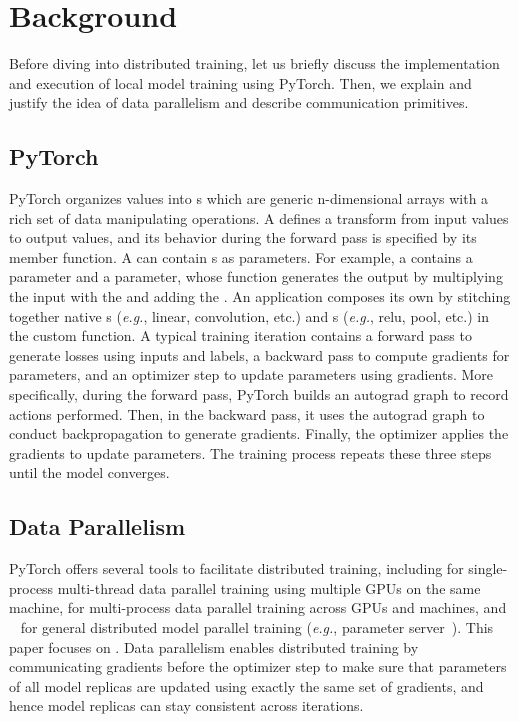 \newpage
\section{Background} \label{sec:background}

Before diving into distributed training, let us briefly discuss the implementation and execution of local model training using PyTorch. Then, we explain and justify the idea of data parallelism and describe communication primitives.

\subsection{PyTorch}

PyTorch organizes values into s which are generic n-dimensional arrays with a rich set of data manipulating operations. A  defines a transform from input values to output values, and its behavior during the forward pass is specified by its  member function. A  can contain s as parameters. For example, a   contains a  parameter and a  parameter, whose  function generates the output by multiplying the input with the  and adding the . An application composes its own  by stitching together native s (\emph{e.g.}, linear, convolution, etc.) and s (\emph{e.g.}, relu, pool, etc.) in the custom  function. A typical training iteration contains a forward pass to generate losses using inputs and labels, a backward pass to compute gradients for parameters, and an optimizer step to update parameters using gradients. More specifically, during the forward pass, PyTorch builds an autograd graph to record actions performed. Then, in the backward pass, it uses the autograd graph to conduct backpropagation to generate gradients. Finally, the optimizer applies the gradients to update parameters. The training process repeats these three steps until the model converges. 


\subsection{Data Parallelism}

PyTorch offers several tools to facilitate distributed training, including  for single-process multi-thread data parallel training using multiple GPUs on the same machine,  for multi-process data parallel training across GPUs and machines, and ~\cite{rpc} for general distributed model parallel training (\emph{e.g.}, parameter server~\cite{ps}). This paper focuses on . Data parallelism enables distributed training by communicating gradients before the optimizer step to make sure that parameters of all model replicas are updated using exactly the same set of gradients, and hence model replicas can stay consistent across iterations. 

